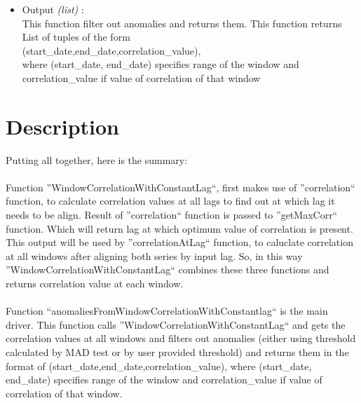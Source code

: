 \begin{itemize}
 \item Output \textit{(list)} : \\
  This function filter out anomalies and returns them. This function returns
  List of tuples of the form \\ (start\_date,end\_date,correlation\_value), \\
  where (start\_date, end\_date) specifies range of the window and 
correlation\_value if value of correlation of that window
  
\end{itemize}

\section{Description}


Putting all together, here is the summary:\\
\\
Function ''WindowCorrelationWithConstantLag``, first makes use of 
''correlation`` function, to calculate correlation values at all lags to find 
out at which lag it needs to be align. Result of ''correlation`` function is 
passed to ''getMaxCorr`` function. Which will return lag at which optimum value 
of correlation is present. This output will be used by ''correlationAtLag`` 
function, to caluclate correlation at all windows after aligning both series by 
input lag. So, in this way ''WindowCorrelationWithConstantLag`` combines these 
three functions and returns correlation value at each window.
\\
\\
Function ``anomaliesFromWindowCorrelationWithConstantlag`` is the main driver. 
This function calls ''WindowCorrelationWithConstantLag`` and gets the 
correlation values at all windows and filters out anomalies (either using 
threshold calculated by MAD test or by user provided threshold) and returns them 
in the format of (start\_date,end\_date,correlation\_value),
  where (start\_date, end\_date) specifies range of the window and 
correlation\_value if value of correlation of that window.